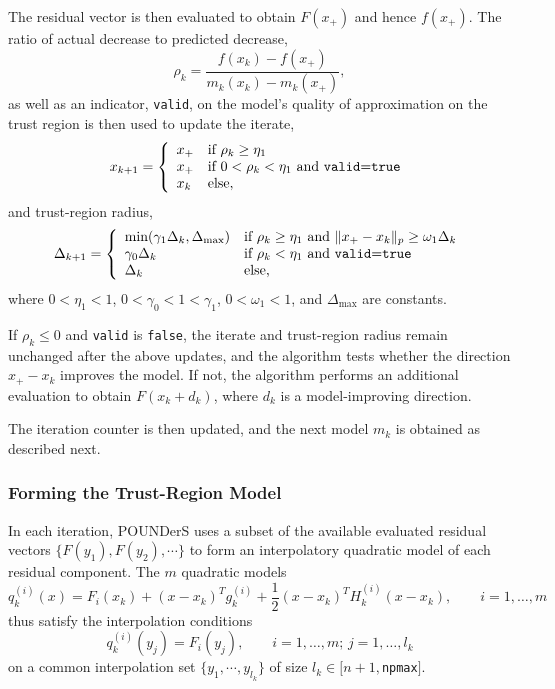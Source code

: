 The residual vector is then evaluated to obtain $F(x_+)$ and hence
$f(x_+)$. The ratio of actual decrease to predicted decrease, 
\[
 \rho_k = \frac{f(x_k)-f(x_+)}{m_k(x_k)-m_k(x_+)},
\]
as well as an indicator, \texttt{valid}, on the model's quality of
approximation on the trust region is then used to update the iterate,
\[
x_{k+1} = \left\{\begin{array}{ll}
x_+ & \mbox{if } \rho_k \geq \eta_1 \\
x_+ & \mbox{if } 0<\rho_k <\eta_1  \mbox{ and \texttt{valid}=\texttt{true}}
\\
x_k & \mbox{else}, 
\end{array}
\right.
\]
and trust-region radius,
\[
\Delta_{k+1} = \left\{\begin{array}{ll}
 \mbox{min}(\gamma_1\Delta_k, \Delta_{\max}) & \mbox{if } \rho_k \geq
\eta_1 \mbox{ and } \|x_+-x_k\|_p\geq \omega_1\Delta_k \\
\gamma_0\Delta_k & \mbox{if } \rho_k < \eta_1 \mbox{ and
\texttt{valid}=\texttt{true}} \\
\Delta_k &  \mbox{else,}
\end{array}
\right.
\]
where $0 < \eta_1 < 1$,  $0 < \gamma_0 < 1 < \gamma_1$, $0<\omega_1<1$,
and $\Delta_{\max}$ are constants. 

If $\rho_k\leq 0$ and \texttt{valid} is \texttt{false}, the
iterate and trust-region radius remain unchanged after the above updates,
and the algorithm tests whether the direction $x_+-x_k$ improves the model. If
not, the algorithm performs an additional evaluation to obtain
$F(x_k+d_k)$, where $d_k$ is a model-improving direction. 

The iteration counter is then updated, and the next model $m_{k}$ is
obtained as described next.

\subsubsection{Forming the Trust-Region Model}
In each iteration, POUNDerS uses a subset of the available evaluated
residual vectors $\{ F(y_1), F(y_2), \cdots \}$ to form an interpolatory
quadratic model of each residual component. The $m$ quadratic models
\begin{equation}
 q_k^{(i)}(x) = 
 F_i(x_k) + (x-x_k)^T g_k^{(i)} + \frac{1}{2} (x-x_k)^T H_k^{(i)} (x-x_k), 
 \qquad i = 1, \ldots, m
\label{eq:models}
\end{equation}
thus satisfy the interpolation conditions 
\[ 
 q_k^{(i)}(y_j) = F_i(y_j), \qquad i=1, \ldots, m; \, j=1,\ldots , l_k
\]
on a common interpolation set $\{y_1, \cdots , y_{l_k}\}$ of size
$l_k\in[n+1,$\texttt{npmax}$]$.

